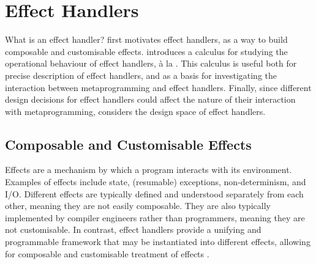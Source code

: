\section{Effect Handlers}\label{section:effects-technical}
What is an effect handler?  first motivates effect handlers, as a way to build composable and customisable effects.  introduces a calculus for studying the operational behaviour of effect handlers, à la \citet{pretnar-15}. This calculus is useful both for precise description of effect handlers, and as a basis for investigating the interaction between metaprogramming and effect handlers. Finally, since different design decisions for effect handlers could affect the nature of their interaction with metaprogramming,  considers the design space of effect handlers.

\subsection{Composable and Customisable Effects}\label{subsection:effect-handler-motivation}
Effects are a mechanism by which a program interacts with its environment. Examples of effects include state, (resumable) exceptions, non-determinism, and I/O. Different effects are typically defined and understood separately from each other, meaning they are not easily composable. They are also typically implemented by compiler engineers rather than programmers, meaning they are not customisable. In contrast, effect handlers provide a unifying and programmable framework that may be instantiated into different effects, allowing for composable and customisable treatment of effects \citep{kiselyov-2012}.





